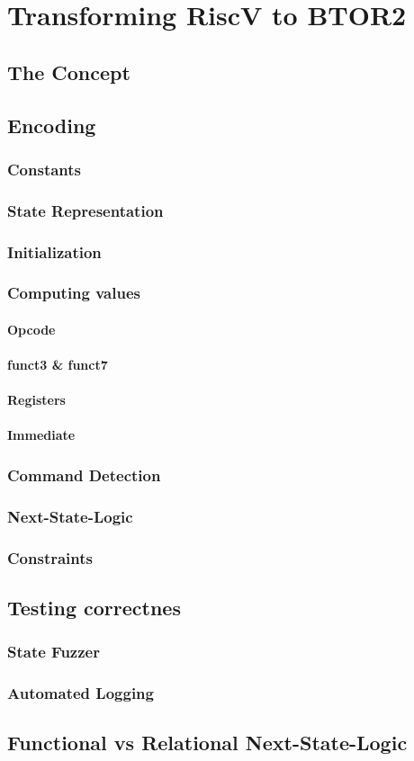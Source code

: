 \chapter{Transforming RiscV to BTOR2}\label{chap:riscv_to_btor2}
\section{The Concept}
\section{Encoding}
\subsection{Constants}
\subsection{State Representation}
\subsection{Initialization}
\subsection{Computing values}
\subsubsection{Opcode}
\subsubsection{funct3 \& funct7}
\subsubsection{Registers}
\subsubsection{Immediate}
\subsection{Command Detection}
\subsection{Next-State-Logic}
\subsection{Constraints}
\section{Testing correctnes}
\subsection{State Fuzzer}
\subsection{Automated Logging}
\section{Functional vs Relational Next-State-Logic}